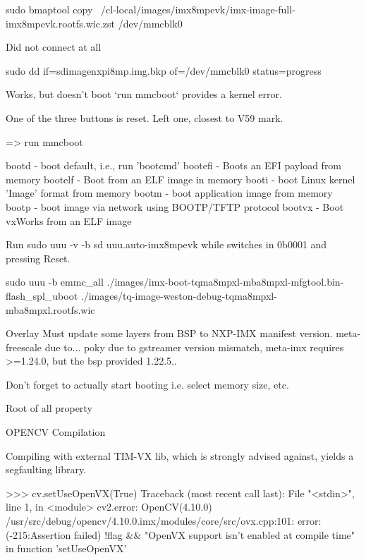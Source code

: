 \sec sudo bmaptool copy ~/cl-local/images/imx8mpevk/imx-image-full-imx8mpevk.rootfs.wic.zst /dev/mmcblk0

Did not connect at all

\sec sudo dd if=sdimagenxpi8mp.img.bkp of=/dev/mmcblk0 status=progress

Works, but doesn't boot `run mmcboot` provides a kernel error.

One of the three buttons is reset.
Left one, closest to V59 mark.

=> run mmcboot


bootd     - boot default, i.e., run 'bootcmd'
bootefi   - Boots an EFI payload from memory
bootelf   - Boot from an ELF image in memory
booti     - boot Linux kernel 'Image' format from memory
bootm     - boot application image from memory
bootp     - boot image via network using BOOTP/TFTP protocol
bootvx    - Boot vxWorks from an ELF image

Run sudo uuu -v -b sd uuu.auto-imx8mpevk
while switches in 0b0001 and pressing Reset.

sudo uuu -b emmc_all ./images/imx-boot-tqma8mpxl-mba8mpxl-mfgtool.bin-flash_spl_uboot ./images/tq-image-weston-debug-tqma8mpxl-mba8mpxl.rootfs.wic

Overlay
Must update some layers from BSP to NXP-IMX manifest version.
meta-freescale due to...
poky due to gstreamer version mismatch, meta-imx requires >=1.24.0,
but the bsp provided 1.22.5..

Don't forget to actually start booting i.e. select memory size, etc.


Root of all property 

\sec OPENCV Compilation

Compiling with external TIM-VX lib,
which is strongly advised against,
yields a segfaulting library.

\begtt{}
>>> cv.setUseOpenVX(True)
Traceback (most recent call last):
  File "<stdin>", line 1, in <module>
cv2.error: OpenCV(4.10.0) /usr/src/debug/opencv/4.10.0.imx/modules/core/src/ovx.cpp:101: error: (-215:Assertion failed) !flag && "OpenVX support isn't enabled at compile time" in function 'setUseOpenVX'

